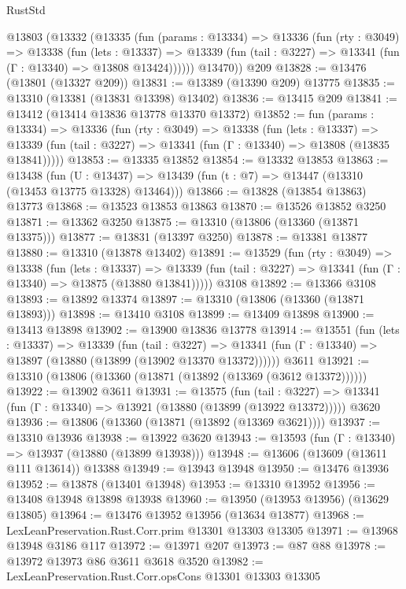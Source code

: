 \begin{lexlean}{RustStd}
\begin{coremodule}
    @13803
      (@13332
        (@13335
          (fun (params : @13334) =>
          @13336
            (fun (rty : @3049) =>
            @13338
              (fun (lets : @13337) =>
              @13339 (fun (tail : @3227) => @13341 (fun (Γ : @13340) => @13808 @13424))))))
        @13470))
    @209
@13828 := @13476 (@13801 (@13327 @209))
@13831 := @13389 (@13390 @209) @13775
@13835 := @13310 (@13381 (@13831 @13398) @13402)
@13836 := @13415 @209
@13841 := @13412 (@13414 @13836 @13778 @13370 @13372)
@13852 := fun (params : @13334) =>
  @13336
    (fun (rty : @3049) =>
    @13338
      (fun (lets : @13337) =>
      @13339 (fun (tail : @3227) => @13341 (fun (Γ : @13340) => @13808 (@13835 @13841)))))
@13853 := @13335 @13852
@13854 := @13332 @13853
@13863 := @13438
    (fun (U : @13437) => @13439 (fun (t : @7) => @13447 (@13310 (@13453 @13775 @13328) @13464)))
@13866 := @13828 (@13854 @13863) @13773
@13868 := @13523 @13853 @13863
@13870 := @13526 @13852 @3250
@13871 := @13362 @3250
@13875 := @13310 (@13806 (@13360 (@13871 @13375)))
@13877 := @13831 (@13397 @3250)
@13878 := @13381 @13877
@13880 := @13310 (@13878 @13402)
@13891 := @13529
    (fun (rty : @3049) =>
    @13338
      (fun (lets : @13337) =>
      @13339 (fun (tail : @3227) => @13341 (fun (Γ : @13340) => @13875 (@13880 @13841)))))
    @3108
@13892 := @13366 @3108
@13893 := @13892 @13374
@13897 := @13310 (@13806 (@13360 (@13871 @13893)))
@13898 := @13410 @3108
@13899 := @13409 @13898
@13900 := @13413 @13898
@13902 := @13900 @13836 @13778
@13914 := @13551
    (fun (lets : @13337) =>
    @13339
      (fun (tail : @3227) =>
      @13341 (fun (Γ : @13340) => @13897 (@13880 (@13899 (@13902 @13370 @13372))))))
    @3611
@13921 := @13310 (@13806 (@13360 (@13871 (@13892 (@13369 (@3612 @13372))))))
@13922 := @13902 @3611
@13931 := @13575
    (fun (tail : @3227) => @13341 (fun (Γ : @13340) => @13921 (@13880 (@13899 (@13922 @13372)))))
    @3620
@13936 := @13806 (@13360 (@13871 (@13892 (@13369 @3621))))
@13937 := @13310 @13936
@13938 := @13922 @3620
@13943 := @13593 (fun (Γ : @13340) => @13937 (@13880 (@13899 @13938)))
@13948 := @13606 (@13609 (@13611 @111 @13614)) @13388
@13949 := @13943 @13948
@13950 := @13476 @13936
@13952 := @13878 (@13401 @13948)
@13953 := @13310 @13952
@13956 := @13408 @13948 @13898 @13938
@13960 := @13950 (@13953 @13956) (@13629 @13805)
@13964 := @13476 @13952 @13956 (@13634 @13877)
@13968 := LexLeanPreservation.Rust.Corr.prim @13301 @13303 @13305
@13971 := @13968 @13948 @3186 @117
@13972 := @13971 @207
@13973 := @87 @88
@13978 := @13972 @13973 @86 @3611 @3618 @3520
@13982 := LexLeanPreservation.Rust.Corr.opsCons @13301 @13303 @13305

\end{coremodule}
\end{lexlean}
